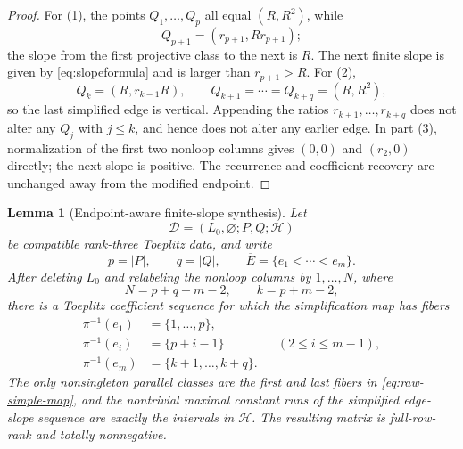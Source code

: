 \documentclass{amsart}
\numberwithin{equation}{section}
\newtheorem{lemma}[theorem]{Lemma}
\theoremstyle{definition}
\theoremstyle{remark}
\begin{document}
\begin{proof}
For (1), the points $Q_1,\ldots,Q_p$ all equal $(R,R^2)$, while
\[
 Q_{p+1}=(r_{p+1},Rr_{p+1});
\]
the slope from the first projective class to the next is $R$.  The next finite slope is given by \eqref{eq:slopeformula} and is larger than $r_{p+1}>R$.  For (2),
\[
 Q_k=(R,r_{k-1}R),
 \qquad
 Q_{k+1}=\cdots=Q_{k+q}=(R,R^2),
\]
so the last simplified edge is vertical.  Appending the ratios $r_{k+1},\ldots,r_{k+q}$ does not alter any $Q_j$ with $j\le k$, and hence does not alter any earlier edge.  In part (3), normalization of the first two nonloop columns gives $(0,0)$ and $(r_2,0)$ directly; the next slope is positive.  The recurrence and coefficient recovery are unchanged away from the modified endpoint.
\end{proof}

\begin{lemma}[Endpoint-aware finite-slope synthesis]\label{lem:endpoint-aware-synthesis}
Let
\[
 \mathcal D=(L_0,\varnothing;P,Q;\mathcal H)
\]
be compatible rank-three Toeplitz data, and write
\[
 p=|P|,\qquad q=|Q|,\qquad
 \overline E=\{e_1<\cdots<e_m\}.
\]
After deleting $L_0$ and relabeling the nonloop columns by $1,\ldots,N$, where
\[
 N=p+q+m-2,
 \qquad
 k=p+m-2,
\]
there is a Toeplitz coefficient sequence for which the simplification map has fibers
\begin{equation}\label{eq:raw-simple-map}
\begin{aligned}
 \pi^{-1}(e_1)&=\{1,\ldots,p\},\\
 \pi^{-1}(e_i)&=\{p+i-1\} &&(2\le i\le m-1),\\
 \pi^{-1}(e_m)&=\{k+1,\ldots,k+q\}.
\end{aligned}
\end{equation}
The only nonsingleton parallel classes are the first and last fibers in \eqref{eq:raw-simple-map}, and the nontrivial maximal constant runs of the simplified edge-slope sequence are exactly the intervals in $\mathcal H$.  The resulting matrix is full-row-rank and totally nonnegative.
\end{lemma}
\end{document}
